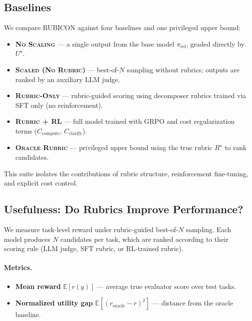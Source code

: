 \documentclass[sigconf]{acmart}
\begin{document}
\subsection{Baselines}

We compare RUBICON against four baselines and one privileged upper bound:

\begin{itemize}
\item \textbf{\textsc{No Scaling}} — a single output from the base model $\pi_{\mathrm{ref}}$, graded directly by $U^\star$.
\item \textbf{\textsc{Scaled (No Rubric)}} — best-of-$N$ sampling without rubrics; outputs are ranked by an auxiliary LLM judge.
\item \textbf{\textsc{Rubric-Only}} — rubric-guided scoring using decomposer rubrics trained via SFT only (no reinforcement).
\item \textbf{\textsc{Rubric + RL}} — full model trained with GRPO and cost regularization terms ($C_{\mathrm{compute}}$, $C_{\mathrm{clarify}}$).
\item \textbf{\textsc{Oracle Rubric}} — privileged upper bound using the true rubric $R^\star$ to rank candidates.
\end{itemize}

This suite isolates the contributions of rubric structure, reinforcement fine-tuning, and explicit cost control.

\subsection{Usefulness: Do Rubrics Improve Performance?}

We measure task-level reward under rubric-guided best-of-$N$ sampling.
Each model produces $N$ candidates per task, which are ranked according to their scoring rule (LLM judge, SFT rubric, or RL-trained rubric).

\paragraph{Metrics.}
\begin{itemize}
    \item \textbf{Mean reward} $\mathbb{E}[r(y)]$ — average true evaluator score over test tasks.
    \item \textbf{Normalized utility gap} $\mathbb{E}[(r_\text{oracle} - r)^2]$ — distance from the oracle baseline.
\end{itemize}
\end{document}
